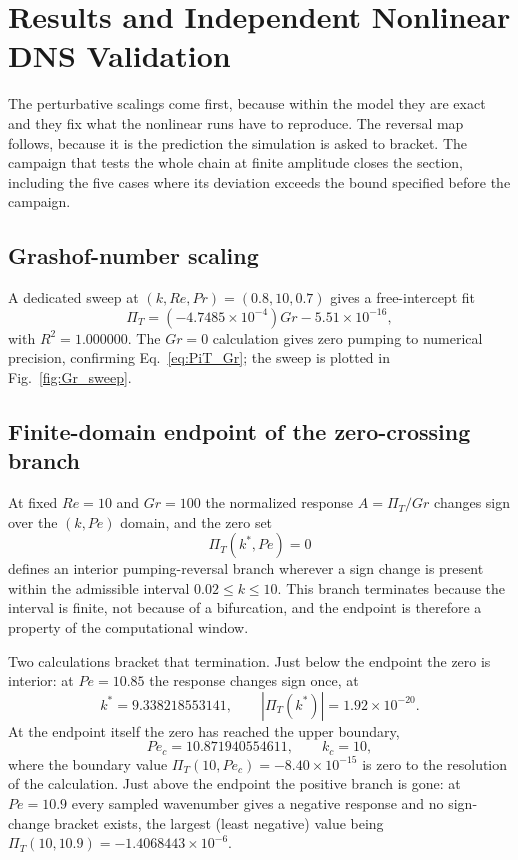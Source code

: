 \documentclass[12pt,a4paper]{article}
\newcommand{\Rey}{\mathit{Re}}
\newcommand{\Pe}{\mathit{Pe}}
\newcommand{\Grr}{\mathit{Gr}}
\renewcommand{\Pr}{\mathit{Pr}}
\newcommand{\PiT}{\Pi_T}
\begin{document}
\section{Results and Independent Nonlinear DNS Validation}
\label{sec:results}

The perturbative scalings come first, because within the model they are exact
and they fix what the nonlinear runs have to reproduce. The reversal map follows,
because it is the prediction the simulation is asked to bracket. The campaign
that tests the whole chain at finite amplitude closes the section, including the
five cases where its deviation exceeds the bound specified before the campaign.

\subsection{Grashof-number scaling}

A dedicated sweep at $(k,\Rey,\Pr)=(0.8,10,0.7)$ gives a free-intercept fit
\begin{equation}
  \PiT=(-4.7485\times10^{-4})\Grr-5.51\times10^{-16},
\end{equation}
with $R^2=1.000000$. The $\Grr=0$ calculation gives zero pumping to numerical precision, confirming
Eq.~\eqref{eq:PiT_Gr}; the sweep is plotted in Fig.~\ref{fig:Gr_sweep}.

\subsection{Finite-domain endpoint of the zero-crossing branch}
\label{subsec:critical_endpoint}

At fixed $\Rey=10$ and $\Grr=100$ the normalized response $A=\PiT/\Grr$
changes sign over the $(k,\Pe)$ domain, and the zero set
\begin{equation}
  \PiT(k^*,\Pe)=0
  \label{eq:zero_locus}
\end{equation}
defines an interior pumping-reversal branch wherever a sign change is present
within the admissible interval $0.02\le k\le10$. This branch terminates
because the interval is finite, not because of a bifurcation, and the
endpoint is therefore a property of the computational window.

Two calculations bracket that termination. Just below the endpoint the zero is
interior: at $\Pe=10.85$ the response changes sign once, at
\begin{equation}
  k^*=9.338218553141,
  \qquad
  \left|\PiT(k^*)\right|=1.92\times10^{-20}.
  \label{eq:interior_root_precise}
\end{equation}
At the endpoint itself the zero has reached the upper boundary,
\begin{equation}
  \Pe_c=10.871940554611,\qquad k_c=10,
  \label{eq:finite_domain_endpoint}
\end{equation}
where the boundary value $\PiT(10,\Pe_c)=-8.40\times10^{-15}$ is zero to the
resolution of the calculation. Just above the endpoint the positive branch is
gone: at $\Pe=10.9$ every sampled wavenumber gives a negative response and no
sign-change bracket exists, the largest (least negative) value being
$\PiT(10,10.9)=-1.4068443\times10^{-6}$.
\end{document}

